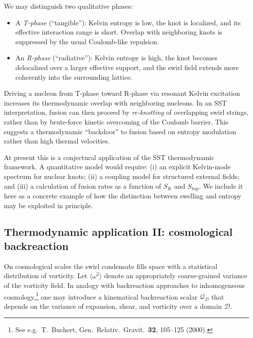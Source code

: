 \documentclass[11pt]{article}
\begin{document}
            We may distinguish two qualitative phases:
            \begin{itemize}
                \item A \emph{T-phase} (``tangible''): Kelvin entropy is low,
                the knot is localized, and its effective interaction range is short.
                Overlap with neighboring knots is suppressed by the usual
                Coulomb-like repulsion.

                \item An \emph{R-phase} (``radiative''): Kelvin entropy is high,
                the knot becomes delocalized over a larger effective support,
                and the swirl field extends more coherently into the surrounding
                lattice.
            \end{itemize}
            Driving a nucleon from T-phase toward R-phase via resonant Kelvin
            excitation increases its thermodynamic overlap with neighboring
            nucleons.
            In an SST interpretation, fusion can then proceed by \emph{re-knotting}
            of overlapping swirl strings, rather than by brute-force kinetic
            overcoming of the Coulomb barrier.
            This suggests a thermodynamic ``backdoor'' to fusion based on entropy
            modulation rather than high thermal velocities.

            At present this is a conjectural application of the SST thermodynamic
            framework.
            A quantitative model would require:
            (i) an explicit Kelvin-mode spectrum for nuclear knots;
            (ii) a coupling model for structured external fields; and
            (iii) a calculation of fusion rates as a function of $S_K$ and
            $S_{\text{top}}$.
            We include it here as a concrete example of how the distinction
            between swelling and entropy may be exploited in principle.

        \subsection{Thermodynamic application II: cosmological backreaction}
            \label{subsec:cosmo-thermo}

            On cosmological scales the swirl condensate fills space with a
            statistical distribution of vorticity.
            Let $\langle \omega^2 \rangle$ denote an appropriately coarse-grained
            variance of the vorticity field.
            In analogy with backreaction approaches to inhomogeneous cosmology,\footnote{%
        See e.g.\ T.~Buchert, Gen.\ Relativ.\ Gravit.\ \textbf{32}, 105--125 (2000).}
            one may introduce a kinematical backreaction scalar
            $\mathcal{Q}_{\mathcal{D}}$ that depends on the variance of expansion,
            shear, and vorticity over a domain $\mathcal{D}$.
\end{document}

